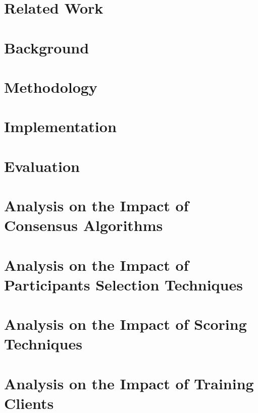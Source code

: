 \documentclass[12pt,a4paper,oneside]{book}
\begin{document}
\chapter{Related Work}\label{chapter:related_work}


\chapter{Background}\label{chapter:background}


\chapter{Methodology}\label{chapter:methodology}


\chapter{Implementation}\label{chapter:implementation}


\chapter{Evaluation}\label{chapter:evaluation}


\chapter{Analysis on the Impact of Consensus Algorithms}\label{chapter:analysis:consensus_algorithms}


\chapter{Analysis on the Impact of Participants Selection Techniques}\label{chapter:analysis:participants}


\chapter{Analysis on the Impact of Scoring Techniques}\label{chapter:analysis:scoring}


\chapter{Analysis on the Impact of Training Clients}\label{chapter:analysis:clients}

\end{document}
